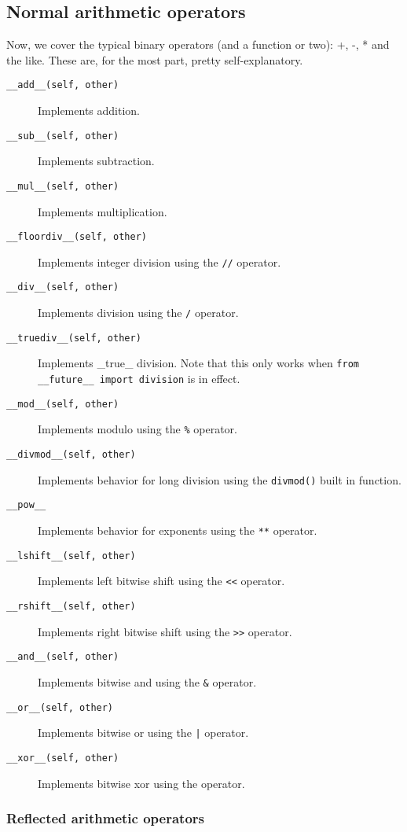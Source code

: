 \documentclass[a4paper,11pt]{article}
\newcommand{\code}[1]{\texttt{#1}}
\begin{document}
\subsection{Normal arithmetic operators}

Now, we cover the typical binary operators (and a function or two): +, -, * and the like. These are, for the most part, pretty self-explanatory.

\begin{description}

\item[\code{__add__(self, other)}]
Implements addition.
\item[\code{__sub__(self, other)}]
Implements subtraction.
\item[\code{__mul__(self, other)}]
Implements multiplication.
\item[\code{__floordiv__(self, other)}]
Implements integer division using the \code{//} operator.
\item[\code{__div__(self, other)}]
Implements division using the \code{/} operator.
\item[\code{__truediv__(self, other)}]
Implements _true_ division. Note that this only works when \code{from __future__ import division} is in effect.
\item[\code{__mod__(self, other)}]
Implements modulo using the \code{\%} operator.
\item[\code{__divmod__(self, other)}]
Implements behavior for long division using the \code{divmod()} built in function.
\item[\code{__pow__}]
Implements behavior for exponents using the \code{**} operator.
\item[\code{__lshift__(self, other)}]
Implements left bitwise shift using the \code{<<} operator.
\item[\code{__rshift__(self, other)}]
Implements right bitwise shift using the \code{>>} operator.
\item[\code{__and__(self, other)}]
Implements bitwise and using the \code{\&} operator.
\item[\code{__or__(self, other)}]
Implements bitwise or using the \code{|} operator.
\item[\code{__xor__(self, other)}]
Implements bitwise xor using the \code{} operator.

\end{description}

\subsubsection{Reflected arithmetic operators}
\end{document}
